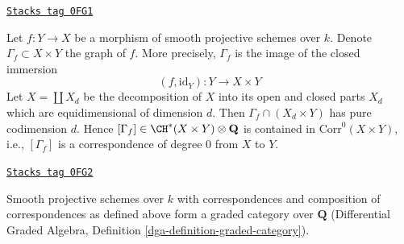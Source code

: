 \begin{example}
\label{weil-example-graph-correspondence}
\href{https://stacks.math.columbia.edu/tag/0FG1}{\texttt{Stacks tag 0FG1}}

Let $f : Y \to X$ be a morphism of smooth projective schemes over $k$.
Denote $\Gamma_f \subset X \times Y$ the graph of $f$. More precisely,
$\Gamma_f$ is the image of the closed immersion
$$
(f, \text{id}_Y) : Y \longrightarrow X \times Y
$$
Let $X = \coprod X_d$ be the decomposition of $X$ into its
open and closed parts $X_d$ which are equidimensional of dimension $d$.
Then $\Gamma_f \cap (X_d \times Y)$ has pure codimension $d$. Hence
$[\Gamma_f] \in \CH^*(X \times Y) \otimes \mathbf{Q}$
is contained in $\text{Corr}^0(X \times Y)$, i.e., $[\Gamma_f]$
is a correspondence of degree $0$ from $X$ to $Y$.
\end{example}

\begin{lemma}
\label{weil-lemma-category-correspondences}
\href{https://stacks.math.columbia.edu/tag/0FG2}{\texttt{Stacks tag 0FG2}}

Smooth projective schemes over $k$ with correspondences and composition
of correspondences as defined above form a graded category over
$\mathbf{Q}$
(Differential Graded Algebra, Definition \ref{dga-definition-graded-category}).
\end{lemma}

